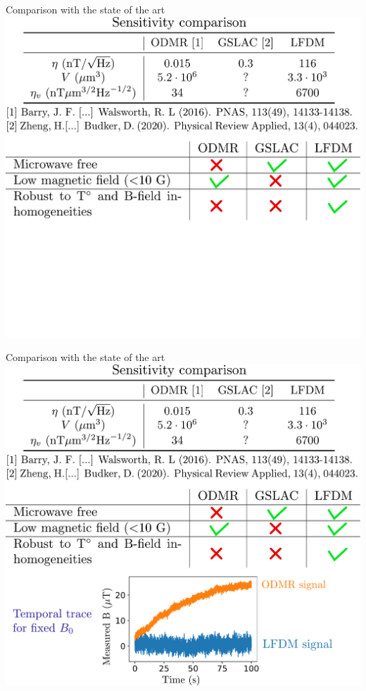 \documentclass{beamer}
\begin{document}
\begin{frame}{Comparison with the state of the art}
\centering
\includegraphics[width=\textwidth,height=0.85\textheight,keepaspectratio]{Slide_comparison_litterature_f-2}
\end{frame}

\begin{frame}{Comparison with the state of the art}
\centering
\includegraphics[width=\textwidth,height=0.85\textheight,keepaspectratio]{Slide_comparison_litterature_f-1}
\end{frame}
\end{document}
